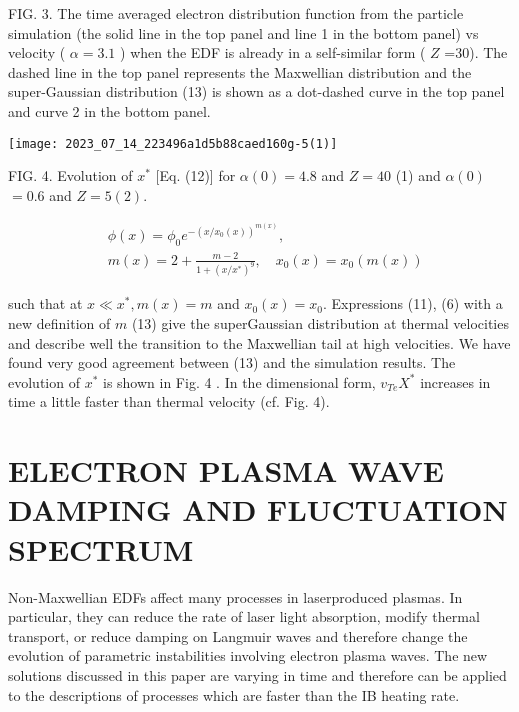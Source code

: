 \documentclass[10pt]{article}
\begin{document}
FIG. 3. The time averaged electron distribution function from the particle simulation (the solid line in the top panel and line 1 in the bottom panel) vs velocity ( $\alpha=3.1$ ) when the EDF is already in a self-similar form ( $Z$ =30). The dashed line in the top panel represents the Maxwellian distribution and the super-Gaussian distribution (13) is shown as a dot-dashed curve in the top panel and curve 2 in the bottom panel.

\begin{center}
\texttt{[image: 2023\_07\_14\_223496a1d5b88caed160g-5(1)]}
\end{center}

FIG. 4. Evolution of $x^{*}$ [Eq. (12)] for $\alpha(0)=4.8$ and $Z=40$ (1) and $\alpha(0)$ $=0.6$ and $Z=5(2)$.

$$
\begin{aligned}
& \phi(x)=\phi_{0} e^{-\left(x / x_{0}(x)\right)^{m(x)}}, \\
& m(x)=2+\frac{m-2}{1+\left(x / x^{*}\right)^{9}}, \quad x_{0}(x)=x_{0}(m(x))
\end{aligned}
$$

such that at $x \ll x^{*}, m(x)=m$ and $x_{0}(x)=x_{0}$. Expressions (11), (6) with a new definition of $m$ (13) give the superGaussian distribution at thermal velocities and describe well the transition to the Maxwellian tail at high velocities. We have found very good agreement between (13) and the simulation results. The evolution of $x^{*}$ is shown in Fig. 4 . In the dimensional form, $v_{T e} X^{*}$ increases in time a little faster than thermal velocity (cf. Fig. 4).

\section{ELECTRON PLASMA WAVE DAMPING AND FLUCTUATION SPECTRUM}
Non-Maxwellian EDFs affect many processes in laserproduced plasmas. In particular, they can reduce the rate of laser light absorption, modify thermal transport, or reduce damping on Langmuir waves and therefore change the evolution of parametric instabilities involving electron plasma waves. The new solutions discussed in this paper are varying in time and therefore can be applied to the descriptions of processes which are faster than the IB heating rate.
\end{document}
